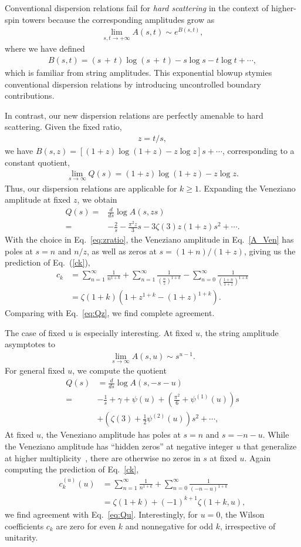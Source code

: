 \documentclass[twocolumn,english,aps,prd,reprint,floatfix,notitlepage,footinbib,preprintnumbers,superscriptaddress,longbibliography]{revtex4-1}
\newcommand{\be}{\begin{equation}}
\newcommand{\ee}{\end{equation}}
\newcommand{\Eq}[1]{Eq.~(\ref{#1})}
\newcommand{\eq}[2]{\be\begin{aligned}#1 \label{#2}\end{aligned}\ee}
\begin{document}
\smallskip
{} Conventional dispersion relations fail for {\it hard scattering} in the context of higher-spin towers because the corresponding amplitudes grow as~\cite{Caron-Huot:2016icg}
\eq{
\lim_{s,t\rightarrow+\infty}A(s,t) \sim e^{B(s,t)} ,
}{}
where we have defined
\eq{
B(s,t) = (s\,{+}\,t)\log(s\,{+}\,t) -s\log s - t \log t +\cdots,
}{}
which is familiar from string amplitudes.  This exponential blowup stymies conventional dispersion relations by introducing uncontrolled boundary contributions.

In contrast, our new dispersion relations are perfectly amenable to hard scattering.  Given the fixed ratio,
\eq{
z=t/s,
}{eq:zratio}
we have $B(s,z) =[(1+z)\log(1+z)-z \log z]s+\cdots$,
 corresponding to a constant quotient,
 \eq{
\lim_{s\rightarrow \infty} Q(s) = (1+z)\log(1+z)-z \log z.
}{}
Thus, our dispersion relations are applicable for $k\geq 1$.  Expanding the Veneziano amplitude at fixed $z$, we obtain
\eq{
Q(s) =& \frac{d}{ds} \log A(s,zs) \\
=& -\frac{2}{s} -\frac{\pi^2z }{3}s -3\zeta(3) z(1+z) s^2 + \cdots.
}{eq:Qz}
With the choice in Eq.~\eqref{eq:zratio}, the Veneziano amplitude in Eq.~\eqref{A_Ven} has poles at $s=n$ and $n/z$, as well as zeros at $s=(1+n)/(1+z)$, giving us the prediction of \Eq{ck},
\eq{
c_k &= \sum_{n=1}^\infty \frac{1}{n^{1+k}} +\sum_{n=1}^\infty \frac{1}{\left(\frac{n}{z}\right)^{1+k}}-\sum_{n=0}^\infty \frac{1}{\left(\frac{1+n}{1+z}\right)^{1+k}}\\
&= \zeta(1+k) \left(1+z^{1+k} -(1+z)^{1+k} \right).
}{}
Comparing with Eq.~\eqref{eq:Qz}, we find complete agreement.


\smallskip
{} The case of fixed $u$ is especially interesting. At fixed $u$, the string amplitude asymptotes to
\eq{
\lim_{s\rightarrow \infty} A(s,u) \sim  s^{u-1}.
}{}
For general fixed $u$, we compute the quotient
\eq{
Q(s)  &= \frac{d}{ds} \log A(s,-s-u) \\
=& -\frac{1}{s} + \gamma +\psi(u) + \left(\frac{\pi^2}{6} + \psi^{(1)}(u) \right)s\\
&+ \left(\zeta(3) + \frac12  \psi^{(2)}(u) \right)s^2 +\cdots ,
}{eq:Qu}
At fixed $u$, the Veneziano amplitude has poles at $s=n$ and $s=-n -u$. While the Veneziano amplitude has ``hidden zeros'' at negative integer $u$ that generalize at higher multiplicity~\cite{Arkani-Hamed:2023swr}, there are otherwise no zeros in $s$ at fixed $u$.
Again computing the prediction of Eq.~\eqref{ck},
\eq{
c_k^{(u)}(u) &= \sum_{n=1}^\infty \frac{1}{n^{1+k}} +\sum_{n=0}^\infty \frac{1}{(-n-u)^{1+k}} \\
&= \zeta(1+k) + (-1)^{k+1} \zeta(1+k,u),
}{cku}
we find agreement with Eq.~\eqref{eq:Qu}.
Interestingly, for $u=0$, the Wilson coefficients $c_k$ are zero for even $k$ and nonnegative for odd $k$, irrespective of unitarity.
\end{document}

